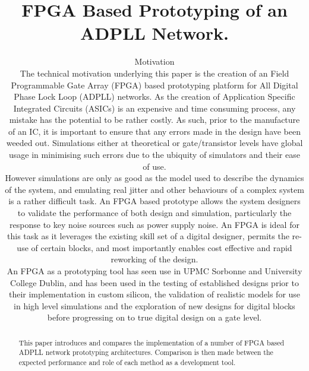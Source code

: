 \documentclass[conference]{IEEEtran}
\begin{document}
\title{FPGA Based Prototyping of an ADPLL Network.\\}

\author{

\maketitle
\begin{abstract}
    This paper introduces and compares the implementation of a number of FPGA based ADPLL network prototyping architectures. Comparison is then made between the expected performance and role of each method as a development tool.
\end{abstract}
\section{Motivation}
The technical motivation underlying this paper is the creation of an Field Programmable Gate Array (FPGA) based prototyping platform for All Digital Phase Lock Loop (ADPLL) networks. As the creation of Application Specific Integrated Circuits (ASICs) is an expensive and time consuming process, any mistake has the potential to be rather costly. As such, prior to the manufacture of an IC, it is important to ensure that any errors made in the design have been weeded out.
Simulations either at theoretical or gate/transistor levels have global usage in minimising such errors due to the ubiquity of simulators and their ease of use.\\
However simulations are only as good as the model used to describe the dynamics of the system, and emulating real jitter and other behaviours of a complex system is a rather difficult task. %
An FPGA based prototype allows the system designers to validate the performance of both design and simulation, particularly the response to key noise sources such as power supply noise. An FPGA is ideal for this task as it leverages the existing skill set of a digital designer, permits the re-use of certain blocks, and most importantly enables cost effective and rapid reworking of the design.\\
An FPGA as a prototyping tool has seen use in UPMC Sorbonne and University College Dublin, and has been used in the testing of established designs prior to their implementation in custom silicon\cite{zianbetov2013phd,shan2014phd}, the validation of realistic models for use in high level simulations\cite{theboys2019} and the exploration of new designs for digital blocks before progressing on to true digital design on a gate level.  %
}
\end{document}
